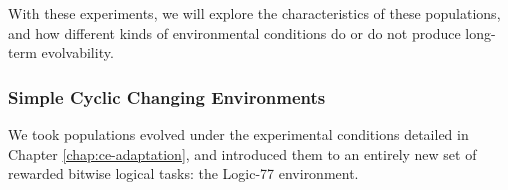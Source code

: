 \documentclass[PhD]{msu-thesis}
\begin{document}
With these experiments, we will explore the characteristics of these populations, and how different kinds of environmental conditions do or do not produce long-term evolvability.  

\subsubsection{Simple Cyclic Changing Environments}
We took populations evolved under the experimental conditions detailed in Chapter \ref{chap:ce-adaptation}, and introduced them to an entirely new set of rewarded bitwise logical tasks: the Logic-77 environment. 

\end{document}
